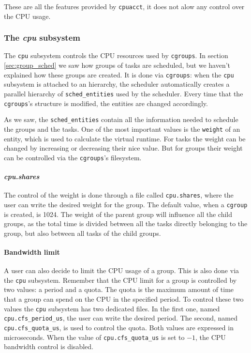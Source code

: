 These are all the features provided by \verb|cpuacct|, it does not alow any control over the CPU usage.

\subsubsection{The \textit{cpu} subsystem}

The \verb|cpu| subsystem controls the CPU resources used by \verb|cgroups|. In section \ref{sec:group_sched} we saw how groups of tasks are scheduled, but we haven't explained how these groups are created. It is done via \verb|cgroups|: when the \verb|cpu| subsystem is attached to an hierarchy, the scheduler automatically creates a parallel hierarchy of \verb|sched_entities| used by the scheduler. Every time that the \verb|cgroups|'s structure is modified, the entities are changed accordingly. 

As we saw, the \verb|sched_entities| contain all the information needed to schedule the groups and the tasks. One of the most important values is the \verb|weight| of an entity, which is used to calculate the virtual runtime. For tasks the weight can be changed by increasing or decreasing their nice value. But for groups their weight can be controlled via the \verb|cgroups|'s filesystem.

\paragraph{\textit{cpu.shares}}
The control of the weight is done through a file called \verb|cpu.shares|, where the user can write the desired weight for the group. The default value, when a \verb|cgroup| is created, is 1024. The weight of the parent group will influence all the child groups, as the total time is divided between all the tasks directly belonging to the group, but also between all tasks of the child groups.

\paragraph{Bandwidth limit}
A user can also decide to limit the CPU usage of a group. This is also done via the \verb|cpu| subsystem. Remember that the CPU limit for a group is controlled by two values: a period and a quota. The quota is the maximum amount of time that a group can spend on the CPU in the specified period. To control these two values the \verb|cpu| subsystem has two dedicated files. In the first one, named \verb|cpu.cfs_period_us|, the user can write the desired period. The second, named \verb|cpu.cfs_quota_us|, is used to control the quota. Both values are expressed in microseconds. When the value of \verb|cpu.cfs_quota_us| is set to $-1$, the CPU bandwidth control is disabled.

